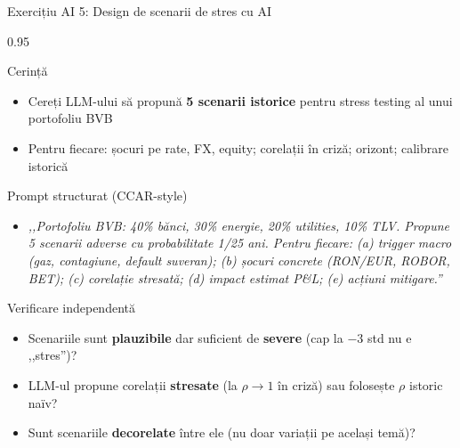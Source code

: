 \documentclass[9pt, aspectratio=169, t]{beamer}
\begin{document}
\begin{frame}[shrink=10]{Exercițiu AI 5: Design de scenarii de stres cu AI}
    \begin{cminipage}{0.95\textwidth}
    \begin{block}{Cerință}
    \begin{itemize}\setlength{\itemsep}{0pt}
        \item Cereți LLM-ului să propună \textbf{5 scenarii istorice} pentru stress testing al unui portofoliu BVB
        \item Pentru fiecare: șocuri pe rate, FX, equity; corelații în criză; orizont; calibrare istorică
    \end{itemize}
    \end{block}
    \begin{exampleblock}{Prompt structurat (CCAR-style)}
    \begin{itemize}\setlength{\itemsep}{0pt}
        \item \textit{,,Portofoliu BVB: 40\% bănci, 30\% energie, 20\% utilities, 10\% TLV. Propune 5 scenarii adverse cu probabilitate 1/25 ani. Pentru fiecare: (a) trigger macro (gaz, contagiune, default suveran); (b) șocuri concrete (RON/EUR, ROBOR, BET); (c) corelație stresată; (d) impact estimat P\&L; (e) acțiuni mitigare.''}
    \end{itemize}
    \end{exampleblock}
    \begin{alertblock}{Verificare independentă}
    \begin{itemize}\setlength{\itemsep}{0pt}
        \item Scenariile sunt \textbf{plauzibile} dar suficient de \textbf{severe} (cap la $-3$ std nu e ,,stres'')?
        \item LLM-ul propune corelații \textbf{stresate} (la $\rho \to 1$ în criză) sau folosește $\rho$ istoric naïv?
        \item Sunt scenariile \textbf{decorelate} între ele (nu doar variații pe același temă)?
    \end{itemize}
    \end{alertblock}
    \end{cminipage}
\end{frame}
\end{document}
